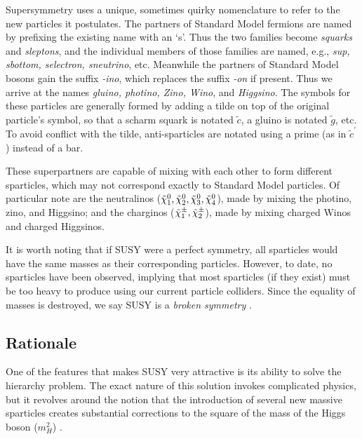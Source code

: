 Supersymmetry uses a unique, sometimes quirky nomenclature to refer to
the new particles it postulates. The partners of Standard Model
fermions are named by prefixing the existing name with an `s'. Thus
the two families become \emph{squarks} and \emph{sleptons}, and the
individual members of those families are named, e.g., \emph{sup,
  sbottom, selectron, sneutrino}, etc. Meanwhile the partners of
Standard Model bosons gain the suffix \emph{-ino}, which replaces the
suffix \emph{-on} if present. Thus we arrive at the names
\emph{gluino, photino, Zino, Wino}, and \emph{Higgsino}. The symbols
for these particles are generally formed by adding a tilde on top of
the original particle's symbol, so that a scharm squark is notated
$\tilde{c}$, a gluino is notated $\tilde{g}$, etc. To avoid conflict
with the tilde, anti-sparticles are notated using a prime (as in
$\tilde{c}^\prime$) instead of a bar.

These superpartners are capable of mixing with each other to form
different sparticles, which may not correspond exactly to Standard
Model particles. Of particular note are the neutralinos
($\tilde{\chi}^0_1, \tilde{\chi}^0_2, \tilde{\chi}^0_3, \tilde{\chi}^0_4$), made by mixing the photino, zino,
and Higgsino; and the charginos ($\tilde{\chi}^\pm_1, \tilde{\chi}^\pm_2$), made by
mixing charged Winos and charged Higgsinos.

It is worth noting that if SUSY were a perfect symmetry, all
sparticles would have the same masses as their corresponding
particles. However, to date, no sparticles have been
observed, implying that most sparticles (if they exist) must be too
heavy to produce using our current particle colliders. Since the
equality of masses is destroyed, we say SUSY is a \emph{broken
symmetry} \cite{susyprimer}.

\subsection{Rationale}
\label{ssec:susy:rationale}

One of the features that makes SUSY very attractive is its ability to
solve the hierarchy problem. The exact nature of this solution
invokes complicated physics, but it revolves around
the notion that the introduction of several new massive sparticles
creates substantial corrections to the square of the mass of the
Higgs boson ($m_H^2$) \cite{susyprimer}.

